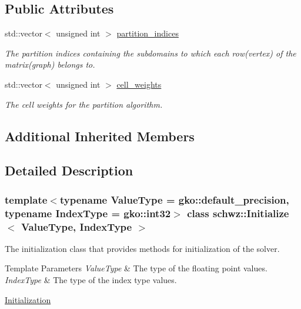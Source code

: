 \subsection*{Public Attributes}
\begin{DoxyCompactItemize}
\item 
\mbox{\label{classschwz_1_1Initialize_a007426e21221298b6dca9b7c9fbd1c10}} 
std\+::vector$<$ unsigned int $>$ \hyperlink{classschwz_1_1Initialize_a007426e21221298b6dca9b7c9fbd1c10}{partition\+\_\+indices}
\begin{DoxyCompactList}\small\item\em The partition indices containing the subdomains to which each row(vertex) of the matrix(graph) belongs to. \end{DoxyCompactList}\item 
\mbox{\label{classschwz_1_1Initialize_a715b9e3a552f77277492d1c86c600681}} 
std\+::vector$<$ unsigned int $>$ \hyperlink{classschwz_1_1Initialize_a715b9e3a552f77277492d1c86c600681}{cell\+\_\+weights}
\begin{DoxyCompactList}\small\item\em The cell weights for the partition algorithm. \end{DoxyCompactList}\end{DoxyCompactItemize}
\subsection*{Additional Inherited Members}


\subsection{Detailed Description}
\subsubsection*{template$<$typename Value\+Type = gko\+::default\+\_\+precision, typename Index\+Type = gko\+::int32$>$\newline
class schwz\+::\+Initialize$<$ Value\+Type, Index\+Type $>$}

The initialization class that provides methods for initialization of the solver. 


\begin{DoxyTemplParams}{Template Parameters}
{\em Value\+Type} & The type of the floating point values. \\
\hline
{\em Index\+Type} & The type of the index type values.\\
\hline
\end{DoxyTemplParams}
\hyperlink{group__init}{Initialization} 

